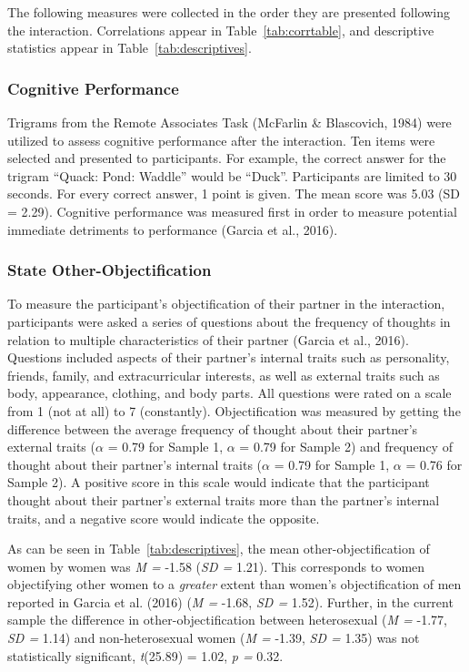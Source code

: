 \documentclass[man]{apa6}
\begin{document}
The following measures were collected in the order they are presented
following the interaction. Correlations appear in
Table~\ref{tab:corrtable}, and descriptive statistics appear in
Table~\ref{tab:descriptives}.

\subsubsection{Cognitive Performance}\label{cognitive-performance}

Trigrams from the Remote Associates Task (McFarlin \& Blascovich, 1984)
were utilized to assess cognitive performance after the interaction. Ten
items were selected and presented to participants. For example, the
correct answer for the trigram \enquote{Quack: Pond: Waddle} would be
\enquote{Duck}. Participants are limited to 30 seconds. For every
correct answer, 1 point is given. The mean score was 5.03 (SD = 2.29).
Cognitive performance was measured first in order to measure potential
immediate detriments to performance (Garcia et al., 2016).

\subsubsection{State
Other-Objectification}\label{state-other-objectification}

To measure the participant's objectification of their partner in the
interaction, participants were asked a series of questions about the
frequency of thoughts in relation to multiple characteristics of their
partner (Garcia et al., 2016). Questions included aspects of their
partner's internal traits such as personality, friends, family, and
extracurricular interests, as well as external traits such as body,
appearance, clothing, and body parts. All questions were rated on a
scale from 1 (not at all) to 7 (constantly). Objectification was
measured by getting the difference between the average frequency of
thought about their partner's external traits (\(\alpha\) = 0.79 for
Sample 1, \(\alpha\) = 0.79 for Sample 2) and frequency of thought about
their partner's internal traits (\(\alpha\) = 0.79 for Sample 1,
\(\alpha\) = 0.76 for Sample 2). A positive score in this scale would
indicate that the participant thought about their partner's external
traits more than the partner's internal traits, and a negative score
would indicate the opposite.

As can be seen in Table~\ref{tab:descriptives}, the mean
other-objectification of women by women was \emph{M =} -1.58 (\emph{SD
=} 1.21). This corresponds to women objectifying other women to a
\emph{greater} extent than women's objectification of men reported in
Garcia et al. (2016) (\emph{M =} -1.68, \emph{SD =} 1.52). Further, in
the current sample the difference in other-objectification between
heterosexual (\emph{M =} -1.77, \emph{SD =} 1.14) and non-heterosexual
women (\emph{M =} -1.39, \emph{SD =} 1.35) was not statistically
significant, \emph{t}(25.89) = 1.02, \emph{p =} 0.32.
\end{document}
